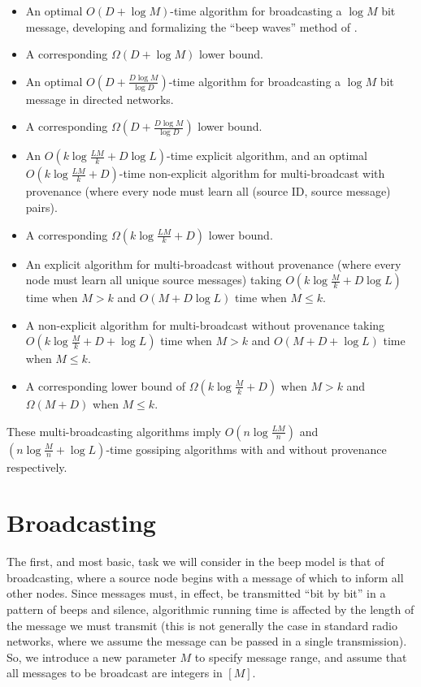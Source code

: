 \documentclass{article}
\begin{document}
\begin{itemize}
	\item An optimal $O(D+\log M)$-time algorithm for broadcasting a $\log M$ bit message, developing and formalizing the ``beep waves'' method of \cite{-GH13}.
	\item A corresponding  $\Omega(D+\log M)$ lower bound.
	\item An optimal $O(D+\frac{D\log M}{\log D})$-time algorithm for broadcasting a $\log M$ bit message in directed networks.
	\item A corresponding  $\Omega(D+\frac{D\log M}{\log D})$ lower bound.
	\item An $O(k \log \frac{LM}{k}+D\log L)$-time explicit algorithm, and an optimal $O(k \log \frac{LM}{k}+D)$-time non-explicit algorithm for multi-broadcast with provenance (where every node must learn all (source ID, source message) pairs).
	\item A corresponding $\Omega(k \log \frac{LM}{k}+D)$ lower bound.
	\item An explicit algorithm for multi-broadcast without provenance (where every node must learn all unique source messages) taking $O(k \log \frac{M}{k}+D\log L)$ time when $M>k$ and $O(M+D\log L)$ time when $M\le k$.
	\item A non-explicit algorithm for multi-broadcast without provenance taking $O(k \log \frac{M}{k}+D+\log L)$ time when $M>k$ and $O(M+D+\log L)$ time when $M\le k$.
	\item A corresponding lower bound of $\Omega(k \log \frac{M}{k}+D)$ when $M>k$ and $\Omega(M+D)$ when $M\le k$.
\end{itemize}

These multi-broadcasting algorithms imply $O(n \log \frac{LM}{n})$ and $(n \log \frac{M}{n}+\log L)$-time gossiping algorithms with and without provenance respectively.

\section{Broadcasting}
The first, and most basic, task we will consider in the beep model is that of broadcasting, where a source node begins with a message of which to inform all other nodes. Since messages must, in effect, be transmitted ``bit by bit'' in a pattern of beeps and silence, algorithmic running time is affected by the length of the message we must transmit (this is not generally the case in standard radio networks, where we assume the message can be passed in a single transmission). So, we introduce a new parameter $M$ to specify message range, and assume that all messages to be broadcast are integers in $[M]$.
\end{document}
